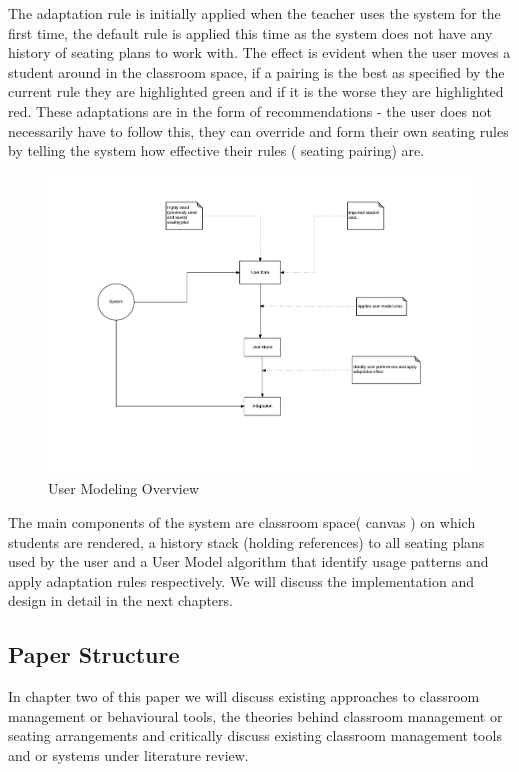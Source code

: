 The adaptation rule is initially applied when the teacher uses the system for the first time, the default rule is applied this time as the system does not have any history of seating plans to work with. The effect is evident when the user moves a student around in the classroom space, if a pairing is the best as specified by the current rule they are highlighted green and if it is the worse they are highlighted red. These adaptations are in the form of recommendations - the user does not necessarily have to follow this, they can override and form their own seating rules by telling the system how effective their rules ( seating pairing) are.


\begin{figure}[!ht]
\caption{User Modeling Overview}
    \label{fig:User-Model}
    \centering
    \includegraphics[scale=0.5]{figures/UM_Overview}
\end{figure}

The main components of the system are classroom space( canvas ) on which students are rendered, a history stack (holding references) to all seating plans used by the user and a User Model algorithm that identify usage patterns and apply adaptation rules respectively. We will discuss the implementation and design in detail in the next chapters.

\subsection{Paper Structure}
In chapter two of this paper we will discuss existing approaches to classroom management or behavioural tools, the theories behind classroom management or seating arrangements and  critically discuss existing classroom management tools and or systems under literature review.

